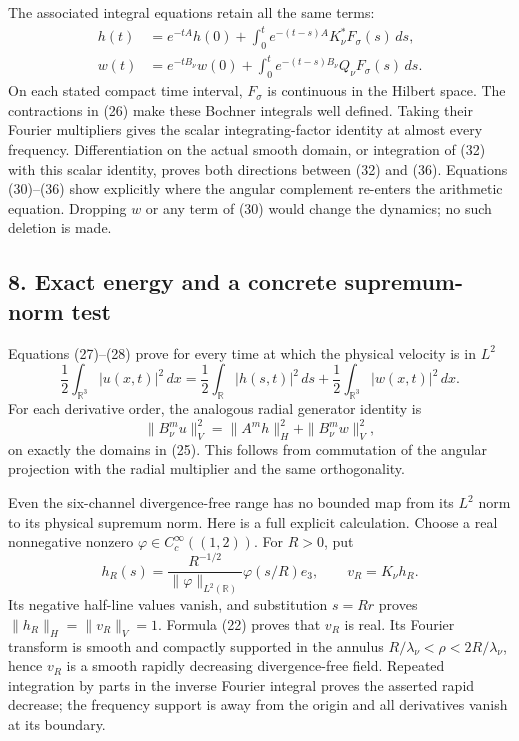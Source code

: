 The associated integral equations retain all the same terms: \[
\begin{aligned}
h(t)&=e^{-tA}h(0)+\int_0^te^{-(t-s)A}K_\nu^*F_\sigma(s)\,ds,\\
w(t)&=e^{-tB_\nu}w(0)+\int_0^te^{-(t-s)B_\nu}Q_\nu F_\sigma(s)\,ds.
\end{aligned}
\tag{36}
\] On each stated compact time interval, \(F_\sigma\) is continuous in the Hilbert space. The contractions in (26) make these Bochner integrals well defined. Taking their Fourier multipliers gives the scalar integrating-factor identity at almost every frequency. Differentiation on the actual smooth domain, or integration of (32) with this scalar identity, proves both directions between (32) and (36). Equations (30)--(36) show explicitly where the angular complement re-enters the arithmetic equation. Dropping \(w\) or any term of (30) would change the dynamics; no such deletion is made.

\subsection{8. Exact energy and a concrete supremum-norm test}\label{exact-energy-and-a-concrete-supremum-norm-test}

Equations (27)--(28) prove for every time at which the physical velocity is in \(L^2\) \[
\frac12\int_{\mathbb R^3}|u(x,t)|^2\,dx
=\frac12\int_{\mathbb R}|h(s,t)|^2\,ds
+\frac12\int_{\mathbb R^3}|w(x,t)|^2\,dx.
\tag{37}
\] For each derivative order, the analogous radial generator identity is \[
\|B_\nu^m u\|_V^2=\|A^mh\|_H^2+\|B_\nu^mw\|_V^2,
\tag{38}
\] on exactly the domains in (25). This follows from commutation of the angular projection with the radial multiplier and the same orthogonality.

Even the six-channel divergence-free range has no bounded map from its \(L^2\) norm to its physical supremum norm. Here is a full explicit calculation. Choose a real nonnegative nonzero \(\varphi\in C_c^\infty((1,2))\). For \(R>0\), put \[
h_R(s)=\frac{R^{-1/2}}{\|\varphi\|_{L^2(\mathbb R)}}\varphi(s/R)e_3,
\qquad v_R=K_\nu h_R.
\tag{39}
\] Its negative half-line values vanish, and substitution \(s=Rr\) proves \(\|h_R\|_H=\|v_R\|_V=1\). Formula (22) proves that \(v_R\) is real. Its Fourier transform is smooth and compactly supported in the annulus \(R/\lambda_\nu<\rho<2R/\lambda_\nu\), hence \(v_R\) is a smooth rapidly decreasing divergence-free field. Repeated integration by parts in the inverse Fourier integral proves the asserted rapid decrease; the frequency support is away from the origin and all derivatives vanish at its boundary.

